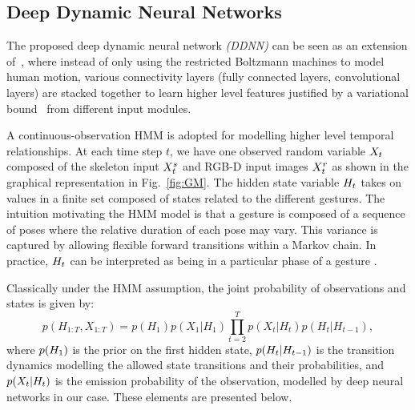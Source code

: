 \subsection{Deep Dynamic Neural Networks}
\label{sec:DDNN}

The proposed deep dynamic neural network \emph{(DDNN)} can be seen as an extension of~\cite{diwucvpr14}, where instead of only using the restricted Boltzmann machines to model human motion, various connectivity layers (fully connected layers, convolutional layers) are stacked together to learn higher level features justified by a variational bound~\cite{hinton2006fast} from different input modules.

A continuous-observation HMM  is adopted for modelling higher level temporal relationships.
At each time step $t$, we have one observed random variable $X_t$
composed of the skeleton input $X^{s}_t$ and RGB-D input images $X^{r}_t$
as shown in the graphical representation in Fig.~\ref{fig:GM}.
%
 The hidden state variable $H_t$ takes on values in a finite set  \finiteset composed of \numberhiddenstate states related to
the different gestures.
 The intuition motivating the HMM model is that a gesture is composed of a sequence of poses where the relative duration of each pose may vary.
This variance is captured by allowing flexible forward transitions within a Markov chain.
In practice,  $H_t$ can be interpreted as being in a particular phase  of a gesture \gesturea{}.

Classically under the HMM assumption, the joint probability of observations and states is given by:
\begin{equation}
p(H_{1:T},X_{1:T}) = p(H_1)p(X_1 | H_1) \prod^{T}_{t=2} p(X_t | H_t ) p(H_t | H_{t-1}),
\label{HMM_GM_1}
\end{equation}
where $p(H_1)$ is the prior on the first hidden state, $p(H_t|H_{t-1})$
is the transition dynamics modelling the allowed state transitions and their probabilities,
 and $p(X_t | H_t )$ is the emission probability of the observation,
modelled by  deep neural networks in our case. These elements are presented below.



